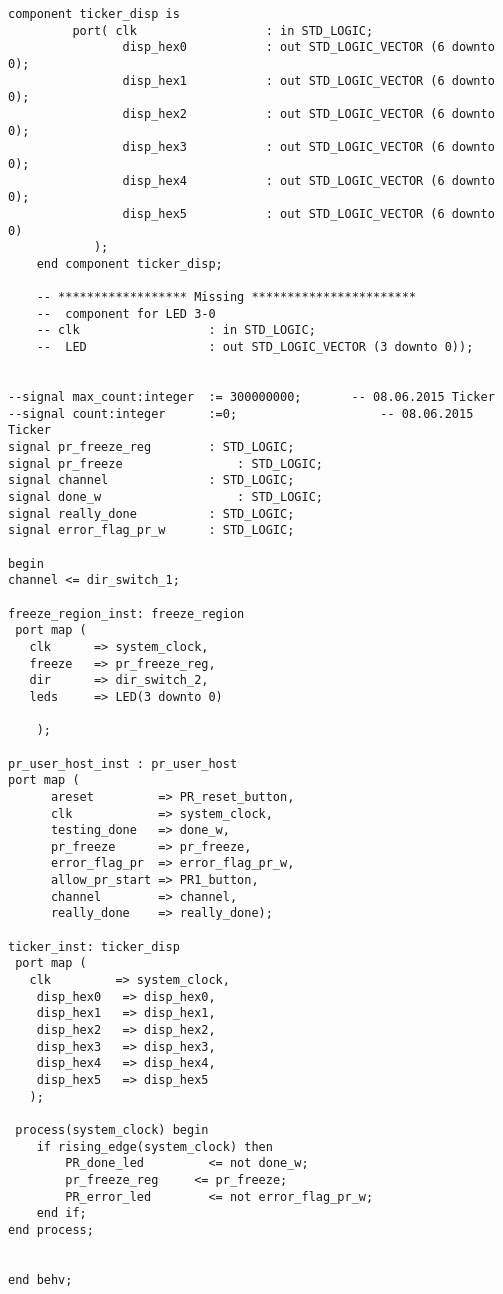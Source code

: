 \begin{lstlisting}[style=vhdl]
    component ticker_disp is
         port( clk                  : in STD_LOGIC;
                disp_hex0           : out STD_LOGIC_VECTOR (6 downto 0);
                disp_hex1           : out STD_LOGIC_VECTOR (6 downto 0);
                disp_hex2           : out STD_LOGIC_VECTOR (6 downto 0);
                disp_hex3           : out STD_LOGIC_VECTOR (6 downto 0);
                disp_hex4           : out STD_LOGIC_VECTOR (6 downto 0);
                disp_hex5           : out STD_LOGIC_VECTOR (6 downto 0)
            );
    end component ticker_disp;
    
    -- ****************** Missing ***********************
    --  component for LED 3-0
    -- clk                  : in STD_LOGIC;
    --  LED                 : out STD_LOGIC_VECTOR (3 downto 0));

    
--signal max_count:integer  := 300000000;       -- 08.06.2015 Ticker
--signal count:integer      :=0;                    -- 08.06.2015 Ticker
signal pr_freeze_reg        : STD_LOGIC;
signal pr_freeze                : STD_LOGIC;
signal channel              : STD_LOGIC;
signal done_w                   : STD_LOGIC;
signal really_done          : STD_LOGIC;
signal error_flag_pr_w      : STD_LOGIC;
     
begin 
channel <= dir_switch_1;
 
freeze_region_inst: freeze_region
 port map (
   clk      => system_clock,
   freeze   => pr_freeze_reg,   
   dir      => dir_switch_2, 
   leds     => LED(3 downto 0)

    );

pr_user_host_inst : pr_user_host    
port map (
      areset         => PR_reset_button,
      clk            => system_clock,
      testing_done   => done_w,
      pr_freeze      => pr_freeze,
      error_flag_pr  => error_flag_pr_w,
      allow_pr_start => PR1_button,
      channel        => channel,
      really_done    => really_done);

ticker_inst: ticker_disp
 port map (
   clk         => system_clock,
    disp_hex0   => disp_hex0,   
    disp_hex1   => disp_hex1,   
    disp_hex2   => disp_hex2,   
    disp_hex3   => disp_hex3,   
    disp_hex4   => disp_hex4,   
    disp_hex5   => disp_hex5
   );
 
 process(system_clock) begin
    if rising_edge(system_clock) then
        PR_done_led         <= not done_w; 
        pr_freeze_reg     <= pr_freeze;     
        PR_error_led        <= not error_flag_pr_w;
    end if; 
end process;

        
end behv;

\end{lstlisting}
